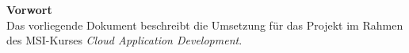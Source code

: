 \documentclass[paper,oneside,onecolumn,notitlepage,bibtotocnumbered,fontsize=12pt,bigheadings,ngerman]{scrartcl}
\newcommand{\sectionnumbering}[1]{%
  \setcounter{section}{0}%
   \renewcommand{\thesection}{\csname #1\endcsname{section}}}
\begin{document}


{\Large \textbf{Vorwort}}
\bigskip
\\
Das vorliegende Dokument beschreibt die Umsetzung für das Projekt im Rahmen des MSI-Kurses \textit{Cloud Application Development}.


\normalsize
\setlength{\parindent}{0pt}
\newpage
\sectionnumbering{Roman} 
\tableofcontents
\clearpage
\listoffigures 
\clearpage 
\listoftables 
\clearpage
{} 
\sectionnumbering{arabic} 













\end{document}
